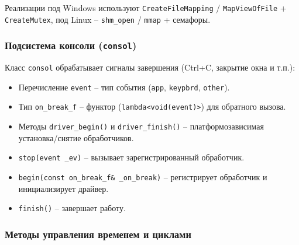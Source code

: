 \documentclass[a4paper,12pt]{article}
\begin{document}
Реализации под Windows используют \texttt{CreateFileMapping} / \texttt{MapViewOfFile} + \texttt{CreateMutex}, под Linux -- \texttt{shm\_open} / \texttt{mmap} + семафоры.

\subsubsection{Подсистема консоли (\texttt{consol})}

Класс \texttt{consol} обрабатывает сигналы завершения (Ctrl+C, закрытие окна и т.п.):
\begin{itemize}
    \item Перечисление \texttt{event} -- тип события (\texttt{app}, \texttt{keypbrd}, \texttt{other}).
    \item Тип \texttt{on\_break\_f} -- функтор (\texttt{lambda<void(event)>}) для обратного вызова.
    \item Методы \texttt{driver\_begin()} и \texttt{driver\_finish()} -- платформозависимая установка/снятие обработчиков.
    \item \texttt{stop(event \_ev)} -- вызывает зарегистрированный обработчик.
    \item \texttt{begin(const on\_break\_f\& \_on\_break)} -- регистрирует обработчик и инициализирует драйвер.
    \item \texttt{finish()} -- завершает работу.
\end{itemize}

\subsubsection{Методы управления временем и циклами}
\end{document}

